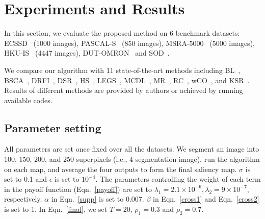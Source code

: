 \documentclass[journal]{IEEEtran}
\begin{document}
\section{Experiments and Results}
In this section, we evaluate the proposed method on 6 benchmark datasets: ECSSD~\cite{Yan2013Hierarchical} (1000 images), PASCAL-S~\cite{Li2014The} (850 images), MSRA-5000~\cite{Liu2011Learning} (5000 images), HKU-IS~\cite{Li2015Visual} (4447 images), DUT-OMRON~\cite{yang2013saliency} and SOD~\cite{Movahedi2010Design}. %

We compare our algorithm with 11 state-of-the-art methods including BL~\cite{tong2015bootstrap}, BSCA~\cite{Qin_2015_CVPR}, DRFI~\cite{jiang2013salient}, DSR~\cite{li2013saliency}, HS~\cite{Yan2013Hierarchical}, LEGS~\cite{Wang2015Deep}, MCDL~\cite{zhao2015saliency}, MR~\cite{yang2013saliency}, RC~\cite{cheng2015global}, wCO~\cite{zhu2014saliency}, and KSR~\cite{Tiantian2016Kernelized}. Results of different methods are provided by authors or achieved by running available codes.

\subsection{Parameter setting}
\label{parameter}
All parameters are set once fixed over all the datasets. We segment an image into 100, 150, 200, and 250 superpixels (i.e., 4 segmentation image), run the algorithm on each map, and average the four outputs to form the final saliency map. $\sigma$ is set to 0.1 and $\epsilon$ is set to $10^{-4}$. The parameters controlling the weight of each term in the payoff function (Eqn.~\ref{payoff}) are set to $\lambda_1 = 2.1 \times 10^{-6}, \lambda_2 = 9 \times 10^{-7}$, respectively. $\alpha$ in Eqn.~\ref{supp} is set to 0.007. $\beta$ in Eqn.~\ref{cross1} and Eqn.~\ref{cross2} is set to 1. In Eqn.~\ref{final}, we set $T=20$, $\rho_1=0.3$ and $\rho_2=0.7$. %
\end{document}
